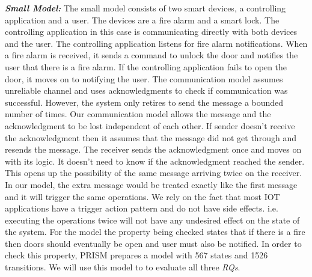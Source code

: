 \textbf{\textit{Small Model:}} The small model consists of two smart devices, a controlling application and a user. The devices are a fire alarm and a smart lock. The controlling application in this case is communicating directly with both devices and the user. The controlling application listens for fire alarm notifications. When a fire alarm is received, it sends a command to unlock the door and notifies the user that there is a fire alarm.   If the controlling application fails to open the door, it moves on to notifying the user. The communication model assumes unreliable channel and uses acknowledgments to check if communication was successful. However, the system only retires to send the message a bounded number of times. Our communication model allows the message and the acknowledgment to be lost independent of each other. If sender doesn't receive the acknowledgment then it assumes that the message did not get through and resends the message. The receiver sends the acknowledgment once and moves on with its logic. It doesn't need to know if the acknowledgment reached the sender. This opens up the possibility of the same message arriving twice on the receiver. In our model, the extra message would be treated exactly like the first message and it will trigger the same operations. We rely on the fact that most IOT applications have a trigger action pattern and do not have side effects. i.e. executing the operations twice will not have any undesired effect on the state of the system. For the model the property being checked states that if there is a fire then doors should eventually be open and user must also be notified. In order to check this property, PRISM prepares a model with 567 states and 1526 transitions. We will use this model to to evaluate all three \textit{RQs}. 

